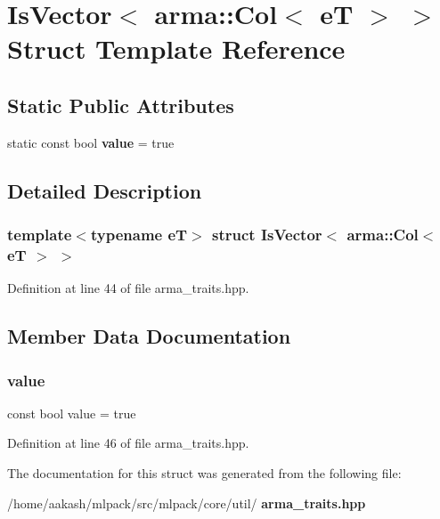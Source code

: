 \section{Is\+Vector$<$ arma\+:\+:Col$<$ eT $>$ $>$ Struct Template Reference}
\label{structIsVector_3_01arma_1_1Col_3_01eT_01_4_01_4}
\subsection*{Static Public Attributes}
\begin{DoxyCompactItemize}
\item 
static const bool \textbf{ value} = true
\end{DoxyCompactItemize}


\subsection{Detailed Description}
\subsubsection*{template$<$typename eT$>$\newline
struct Is\+Vector$<$ arma\+::\+Col$<$ e\+T $>$ $>$}



Definition at line 44 of file arma\+\_\+traits.\+hpp.



\subsection{Member Data Documentation}
\mbox{\label{structIsVector_3_01arma_1_1Col_3_01eT_01_4_01_4_a11ddd051208250c32dc4985abcafa86d}} 
\subsubsection{value}
{\footnotesize\ttfamily const bool value = true\hspace{0.3cm}{\ttfamily [static]}}



Definition at line 46 of file arma\+\_\+traits.\+hpp.



The documentation for this struct was generated from the following file\+:\begin{DoxyCompactItemize}
\item 
/home/aakash/mlpack/src/mlpack/core/util/\textbf{ arma\+\_\+traits.\+hpp}\end{DoxyCompactItemize}
